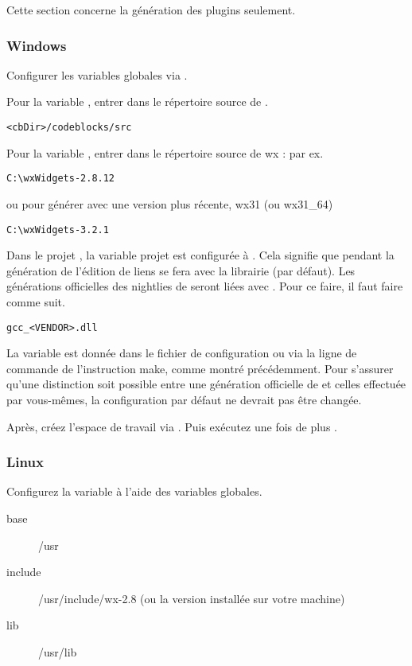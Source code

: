 Cette section concerne la génération des plugins seulement.

\subsubsection{Windows}

Configurer les variables globales via .


Pour la variable , entrer dans  le répertoire source de \codeblocks.

\begin{verbatim}
<cbDir>/codeblocks/src
\end{verbatim}


Pour la variable , entrer dans  le répertoire source de wx : par ex.

\begin{verbatim}
C:\wxWidgets-2.8.12
\end{verbatim}

ou pour générer avec une version plus récente, wx31 (ou wx31\_64)

\begin{verbatim}
C:\wxWidgets-3.2.1
\end{verbatim}

Dans le projet \codeblocks, la variable projet  est configurée à . Cela signifie que pendant la génération de \codeblocks l'édition de liens se fera avec la librairie  (par défaut). Les générations officielles des nightlies de \codeblocks seront liées avec . Pour ce faire, il faut faire comme suit.

\begin{verbatim}
gcc_<VENDOR>.dll
\end{verbatim}

La variable  est donnée dans le fichier de configuration  ou via la ligne de commande de l'instruction make, comme montré précédemment. Pour s'assurer qu'une distinction soit possible entre une génération officielle de \codeblocks et celles effectuée par vous-mêmes, la configuration par défaut  ne devrait pas être changée.

Après, créez l'espace de travail  via . Puis exécutez une fois de plus .

\subsubsection{Linux}

Configurez la variable  à l'aide des variables globales.

\begin{description}
\item[base] /usr
\item[include] /usr/include/wx-2.8 (ou la version installée sur votre machine)
\item[lib] /usr/lib
\end{description}


